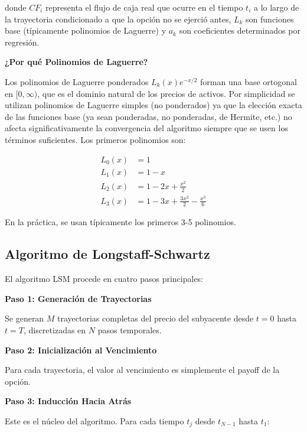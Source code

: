 donde $CF_i$ representa el flujo de caja real que ocurre en el tiempo $t_i$ a lo largo de la trayectoria condicionado a que la opción no se ejerció antes, $L_k$ son funciones base (típicamente polinomios de Laguerre) y $a_k$ son coeficientes determinados por regresión.

\textbf{¿Por qué Polinomios de Laguerre?}

Los polinomios de Laguerre ponderados $L_k(x) e^{-x/2}$ forman una base ortogonal en $[0, \infty)$, que es el dominio natural de los precios de activos. Por simplicidad se utilizan polinomios de Laguerre simples (no ponderados) ya que la elección exacta de las funciones base (ya sean ponderadas, no ponderadas, de Hermite, etc.) no afecta significativamente la convergencia del algoritmo siempre que se usen los términos suficientes. Los primeros polinomios son:

\begin{align}
L_0(x) &= 1 \\
L_1(x) &= 1 - x \\
L_2(x) &= 1 - 2x + \frac{x^2}{2} \\
L_3(x) &= 1 - 3x + \frac{3x^2}{2} - \frac{x^3}{6}
\end{align}

En la práctica, se usan típicamente los primeros 3-5 polinomios.

\subsection{Algoritmo de Longstaff-Schwartz}

El algoritmo LSM procede en cuatro pasos principales:

\textbf{Paso 1: Generación de Trayectorias}

Se generan $M$ trayectorias completas del precio del subyacente desde $t=0$ hasta $t=T$, discretizadas en $N$ pasos temporales.

\textbf{Paso 2: Inicialización al Vencimiento}

Para cada trayectoria, el valor al vencimiento es simplemente el payoff de la opción.

\textbf{Paso 3: Inducción Hacia Atrás}

Este es el núcleo del algoritmo. Para cada tiempo $t_j$ desde $t_{N-1}$ hasta $t_1$:

